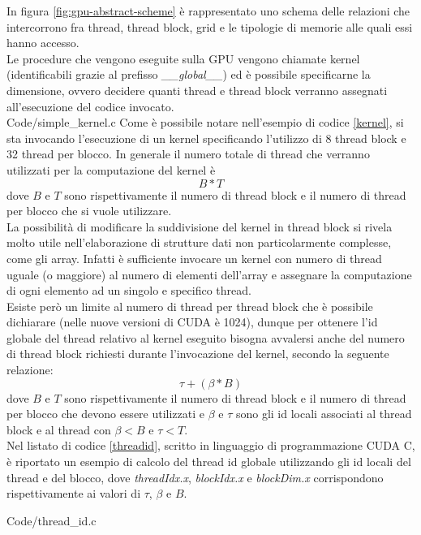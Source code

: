 In figura \ref{fig:gpu-abstract-scheme} è rappresentato uno schema delle
relazioni che intercorrono fra thread, thread block, grid e le
tipologie di memorie alle quali essi hanno accesso.
\\
Le procedure che vengono eseguite sulla GPU vengono chiamate kernel
(identificabili grazie al prefisso \textit{\_\_global\_\_})
ed è possibile specificarne la dimensione, ovvero decidere quanti
thread e thread block verranno assegnati
all'esecuzione del codice invocato.
\\

    {Code/simple_kernel.c}
Come è possibile notare nell'esempio di codice \ref{kernel}, si sta invocando
l'esecuzione di un kernel specificando l'utilizzo di 8 thread block e
32 thread per blocco. In generale il numero totale di
thread che verranno utilizzati per la computazione del kernel è
$$B * T$$ dove $B$ e $T$
sono rispettivamente
il numero di thread block e il numero
di thread per blocco che si vuole utilizzare.
\\
La possibilità di modificare la suddivisione del kernel in thread block
si rivela molto utile nell'elaborazione di strutture dati non
particolarmente complesse, come gli array.
Infatti è sufficiente invocare un kernel con numero di thread
uguale (o maggiore) al numero di elementi dell'array e assegnare la
computazione di ogni elemento ad un singolo e specifico thread.
\\
Esiste però un limite al numero di thread per thread block che è possibile
dichiarare (nelle nuove versioni di CUDA è 1024), dunque per ottenere
l'id globale del thread relativo al kernel eseguito bisogna avvalersi anche
del numero di thread block richiesti durante l'invocazione del kernel,
secondo la seguente relazione:
$$\tau + (\beta * B)$$
dove $B$ e $T$ sono rispettivamente il numero di thread block
e il numero di thread per blocco che
devono essere utilizzati e $\beta$ e $\tau$ sono gli id locali
associati al thread block e
al thread con $\beta < B$ e $\tau < T$.
\\
Nel listato di codice \ref{threadid}, scritto in linguaggio di programmazione
CUDA C, è riportato un esempio di calcolo del
thread id globale utilizzando gli id locali del thread e del blocco, dove
\textit{threadIdx.x}, \textit{blockIdx.x} e \textit{blockDim.x} corrispondono
rispettivamente ai valori di $\tau$, $\beta$ e $B$.


    {Code/thread_id.c}

